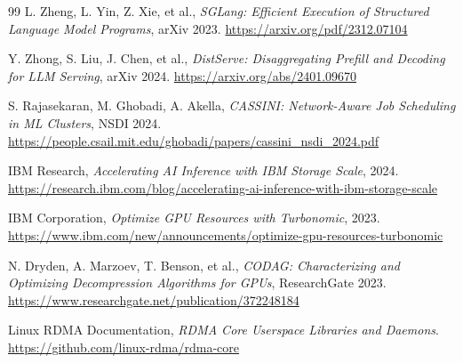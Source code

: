\documentclass[10pt,letterpaper]{article}
\begin{document}
\begin{thebibliography}{99}
L. Zheng, L. Yin, Z. Xie, et al.,
\textit{SGLang: Efficient Execution of Structured Language Model Programs},
arXiv 2023.
\url{https://arxiv.org/pdf/2312.07104}

Y. Zhong, S. Liu, J. Chen, et al.,
\textit{DistServe: Disaggregating Prefill and Decoding for LLM Serving},
arXiv 2024.
\url{https://arxiv.org/abs/2401.09670}

S. Rajasekaran, M. Ghobadi, A. Akella,
\textit{CASSINI: Network-Aware Job Scheduling in ML Clusters},
NSDI 2024.
\url{https://people.csail.mit.edu/ghobadi/papers/cassini_nsdi_2024.pdf}

IBM Research,
\textit{Accelerating AI Inference with IBM Storage Scale}, 2024.
\url{https://research.ibm.com/blog/accelerating-ai-inference-with-ibm-storage-scale}

IBM Corporation,
\textit{Optimize GPU Resources with Turbonomic}, 2023.
\url{https://www.ibm.com/new/announcements/optimize-gpu-resources-turbonomic}

N. Dryden, A. Marzoev, T. Benson, et al.,
\textit{CODAG: Characterizing and Optimizing Decompression Algorithms for GPUs},
ResearchGate 2023.
\url{https://www.researchgate.net/publication/372248184}



Linux RDMA Documentation,
\textit{RDMA Core Userspace Libraries and Daemons}.
\url{https://github.com/linux-rdma/rdma-core}

\end{thebibliography}
\end{document}
